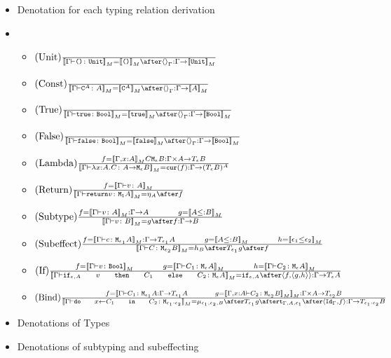 \documentclass{report}
\begin{document}
\begin{itemize}
    \item Denotation for each typing relation derivation
    \item \begin{itemize}
        \item $\treerule{Unit}{}{\deno{\typerelation{\G}{\u}{\U}} = \deno{\u} \after \term{\G} : \G \rightarrow \deno{\U}}$
        
        \item $\treerule{Const}{}{\deno{\typerelation{\G}{\const{A}}{A}} = \deno{\const{A}} \after \term{\G} : \G \rightarrow \deno{A}}$
         
        \item $\treerule{True}{}{\deno{\typerelation{\G}{\t}{\B}} = \deno{\t} \after \term{\G} : \G \rightarrow \deno{\B}}$
        
        \item $\treerule{False}{}{\deno{\typerelation{\G}{\f}{\B}} = \deno{\f} \after \term{\G} : \G \rightarrow \deno{\B}}$
        
        \item $(\text{Lambda}) \frac{f = {\bf [\![}\Gamma, x: A{\bf ]\!]}_M{C}{\texttt{M}_{\epsilon}{B}} : \Gamma \times A \rightarrow T_{\epsilon}{B}}{{\bf [\![}\Gamma \vdash \lambda x : A. C \colon A \rightarrow \texttt{M}_{\epsilon}{B}{\bf ]\!]}_M = \texttt{cur}(f) : \Gamma \rightarrow (T_{\epsilon}{B})^A}$
        
        \item $\treerule{Return}{f = \deno{\typerelation{\G}{v}{A}}}{\deno{\typerelation{\G}{\return{v}}{\M{\1}{A}}} = \point{A} \after f}$
        
        \item $\treerule{Subtype}{f = \deno{\typerelation{\G}{v}{A}} : \G \rightarrow A\s\s g = \deno{A \subtype B}}{\deno{\typerelation{\G}{v}{B}} = g \after f : \G \rightarrow B}$
        \item $\treerule{Subeffect}{f = \deno{\typerelation{\G}{c}{\M{\e_1}{A}}}: \G \rightarrow \T{\e_1}{A} \s\s g = \deno{A \subtype B}\s\s h = \deno{\e_1 \subeffect{ \e_2}}}{\deno{\typerelation{\G}{C}{\M{\e_2}{B}}} = h_B \after \T{\e_1}{g} \after f}$
        
        \item $\treerule{If}{f = \deno{\typerelation{\G}{v}{\B}}\s\s g = \deno{\typerelation{\G}{C_1}{\M{\e}{A}}}\s\s h = \deno{\typerelation{\G}{C_2}{\M{\e}{A}}}}{\deno{{\typerelation{\G}{\ifthenelse{\e}{A}{v}{C_1}{C_2}}{\M{\e}{A}}}} = \ifd{\e}{A} \after \pr{f}{\pr{g}{h}} : \G \rightarrow \T{\e}{A}}$
        \item $\treerule{Bind}{f = \deno{\typerelation{\G}{C_1}{\M{\e_1}{A}} : \G \rightarrow \T{\e_1}{A}\s\s g = \deno{\typerelation{\G, x: A}{C_2}{\M{\e_2}{B}}}}: \G \times A \rightarrow \T{\e_2}{B}}{\deno{\typerelation{\G}{\doin{x}{C_1}{C_2}}{\M{\e_1 \cdot \e_2}}} = \bind{\e_1}{\e_2}{B} \after \T{\e_1}{g} \after \tstrength{\G}{A}{\e_1} \after \pr{\Id{\G}}{f}: \G \rightarrow \T{\e_1 \cdot \e_2}{B}}$
    \end{itemize}
    \item Denotations of Types
    \item Denotations of subtyping and subeffecting
\end{itemize}
    
\end{document}
